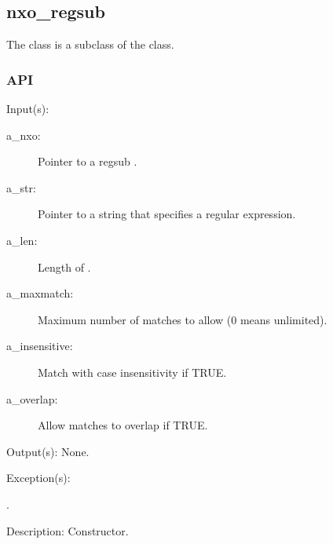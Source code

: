%
%
%
%
%              

\subsection{nxo\_regsub}
\label{nxo_regsub}

The  class is a subclass of the  class.

\subsubsection{API}
\begin{capi}
\label{nxo_regsub_new}
	\begin{capilist}
	\item[Input(s): ]
		\begin{description}\item[]
		\item[a\_nxo: ]
			Pointer to a regsub .
		\item[a\_str: ]
			Pointer to a string that specifies a regular expression.
		\item[a\_len: ]
			Length of .
		\item[a\_maxmatch: ]
			Maximum number of matches to allow (0 means unlimited).
		\item[a\_insensitive: ]
			Match with case insensitivity if TRUE.
		\item[a\_overlap: ]
			Allow matches to overlap if TRUE.
		\end{description}
	\item[Output(s): ] None.
	\item[Exception(s): ]
		\begin{description}\item[]
		\item[.]
		\end{description}
	\item[Description: ]
		Constructor.
	\end{capilist}
\end{capi}
